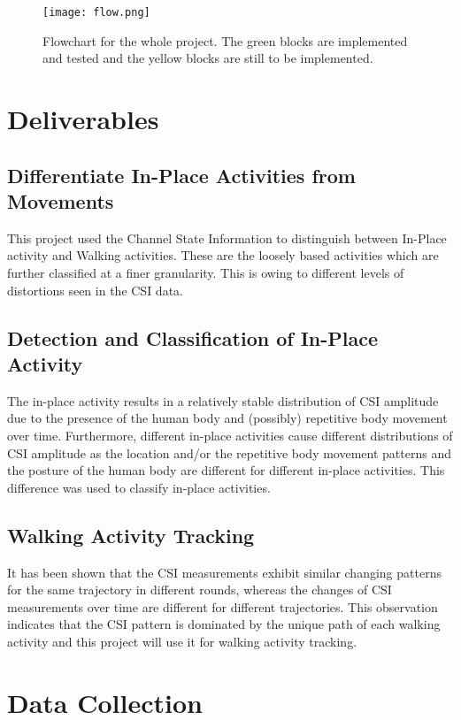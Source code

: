 \documentclass[letterpaper]{article}
\begin{document}
\begin{figure}
	\centering
	\texttt{[image: flow.png]}
	\caption{\label{} Flowchart for the whole project. The green blocks are implemented and tested and the yellow blocks are still to be implemented.}
\end{figure}

\section{Deliverables}

\subsection{Differentiate In-Place Activities  from Movements}

This project used the Channel State Information to distinguish between In-Place activity and Walking activities. These are the loosely based activities which are further classified at a finer granularity. This is owing to different levels of distortions seen in the CSI data.

\subsection{Detection and Classification of In-Place Activity}

The in-place activity results in a relatively stable distribution of CSI amplitude due to the presence of the human body and (possibly) repetitive body movement over time. Furthermore, different in-place activities cause different distributions of CSI amplitude as the location and/or the repetitive body movement patterns and the posture of the human body are different for different in-place activities. This difference was used to classify in-place activities.

\subsection{Walking Activity Tracking}

It has been shown that the CSI measurements exhibit similar changing patterns for the same trajectory in different rounds, whereas the changes of CSI measurements over time are different for different trajectories. This observation indicates that the CSI pattern is dominated by the unique path of each walking activity and this project will use it for walking activity tracking. 

\section{Data Collection}
\end{document}

